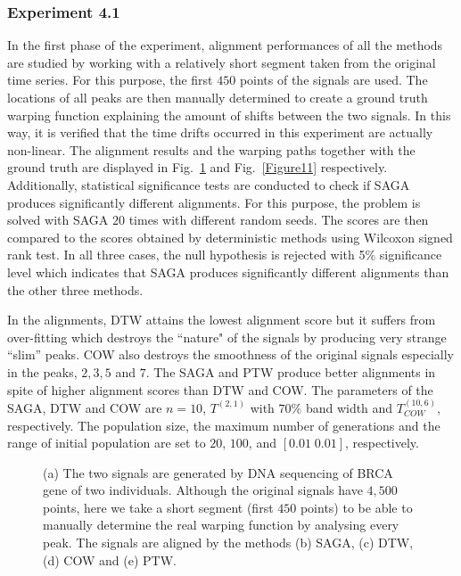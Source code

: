 \documentclass[number,1p,12pt]{elsarticle}
\begin{document}
\subsubsection{Experiment 4.1}
In the first phase of the experiment, alignment performances of all the methods are studied by working with a relatively short segment taken from the original time series. For this purpose, the first $450$ points of the signals are used. The locations of all peaks are then manually determined to create a ground truth warping function explaining the amount of shifts between the two signals. In this way, it is verified that the time drifts occurred in this experiment are actually non-linear. The alignment results and the warping paths together with the ground truth are displayed in Fig.~\ref{Figure10} and Fig.~\ref{Figure11} respectively. Additionally, statistical significance tests are conducted to check if SAGA produces significantly different alignments. For this purpose, the problem is solved with SAGA $20$ times with different random seeds. The scores are then  compared to the scores obtained by deterministic methods using Wilcoxon signed rank test. In all three cases, the null hypothesis is rejected with 5\% significance level which indicates that SAGA produces significantly different alignments than the other three methods. 

In the alignments, DTW attains the lowest alignment score but it suffers from over-fitting which destroys the ``nature" of the signals by producing very strange ``slim'' peaks.  COW also destroys the smoothness of the original signals especially in the peaks, $2, 3, 5$ and $7$. The SAGA and PTW produce better alignments in spite of higher alignment scores than DTW and COW. The parameters of the SAGA, DTW and COW are $n=10$, $T^{(2,1)}$ with $70\%$ band width and $T_{COW}^{(10,6)}$, respectively. The population size, the maximum number of generations and the range of initial population are set to $20$, $100$, and $[0.01\;0.01]$, respectively.

\begin{figure}
\caption{(a) The two signals are generated by DNA sequencing of BRCA gene of two individuals. Although the original signals have $4,500$ points,  here we take a short segment (first $450$ points) to be able to manually determine the real warping function by analysing every peak.  The signals are aligned by the methods (b) SAGA, (c) DTW, (d) COW and (e) PTW. }
\label{Figure10}
\end{figure} 
\end{document}
